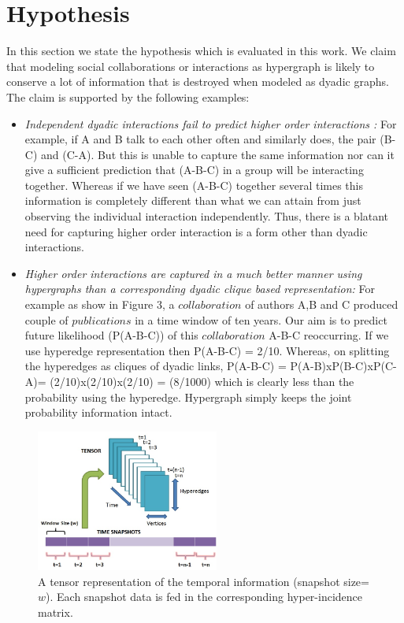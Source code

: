 \documentclass[twoside,leqno,twocolumn]{article}
\begin{document}
\section{Hypothesis}

In this section we state the hypothesis which is evaluated in this work. We claim that modeling social collaborations or interactions as hypergraph is likely to conserve a lot of information that is destroyed when modeled as dyadic graphs. The claim is supported by the following examples:

\begin{itemize}

\item \textit{Independent dyadic interactions fail to predict higher order interactions :} For example, if A and B talk to each other often and similarly does, the pair (B-C) and (C-A). But this is unable to capture the same information nor can it give a sufficient prediction that (A-B-C) in a group will be interacting together. Whereas if we have seen (A-B-C) together several times this information is completely different than what we can attain from just observing the individual interaction independently. Thus, there is a blatant need for capturing higher order interaction is a form other than dyadic interactions. 

\item \textit{Higher order interactions are captured in a much better manner using hypergraphs than a corresponding dyadic clique based representation:} For example as show in Figure 3, a $collaboration$ of authors A,B and C produced couple of $publications$ in a time window of ten years. Our aim is to predict future likelihood (P(A-B-C)) of this $collaboration$ A-B-C reoccurring. If we use hyperedge representation then P(A-B-C) = 2/10. Whereas, on splitting the hyperedges as cliques of dyadic links, P(A-B-C) = P(A-B)xP(B-C)xP(C-A)= (2/10)x(2/10)x(2/10) = (8/1000) which is clearly less than the probability using the hyperedge. Hypergraph simply keeps the joint probability information intact.
\end{itemize}

\begin{figure}[h!]
\centering
\includegraphics[width=60mm]{time_snap.jpg}
\caption{A tensor representation of the temporal information (snapshot size=$w$). Each snapshot data is fed in the corresponding hyper-incidence matrix.}
\label{overflow}
\vspace{-1.7em}
\end{figure}
\end{document}
